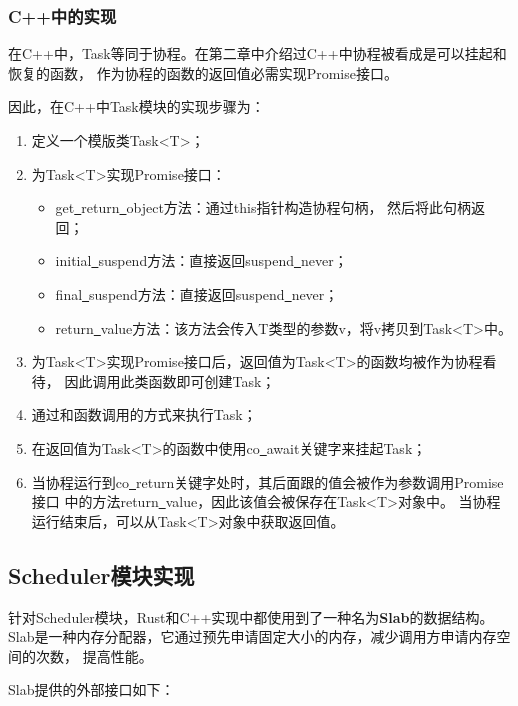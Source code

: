 \documentclass[supercite]{HustGraduPaper}
\theoremstyle{definition}
\begin{document}
\subsubsection{C++中的实现}

在C++中，Task等同于协程。在第二章中介绍过C++中协程被看成是可以挂起和恢复的函数，
作为协程的函数的返回值必需实现Promise接口。\par

因此，在C++中Task模块的实现步骤为：

\begin{enumerate}
  \item 定义一个模版类Task<T>；
  \item 为Task<T>实现Promise接口：
    \begin{itemize}
      \item get\underline{~}return\underline{~}object方法：通过this指针构造协程句柄，
        然后将此句柄返回；
      \item initial\underline{~}suspend方法：直接返回suspend\underline{~}never；
      \item final\underline{~}suspend方法：直接返回suspend\underline{~}never；
      \item return\underline{~}value方法：该方法会传入T类型的参数v，将v拷贝到Task<T>中。
    \end{itemize}
  \item 为Task<T>实现Promise接口后，返回值为Task<T>的函数均被作为协程看待，
    因此调用此类函数即可创建Task；
  \item 通过和函数调用的方式来执行Task；
  \item 在返回值为Task<T>的函数中使用co\underline{~}await关键字来挂起Task；
  \item 当协程运行到co\underline{~}return关键字处时，其后面跟的值会被作为参数调用Promise接口
    中的方法return\underline{~}value，因此该值会被保存在Task<T>对象中。
    当协程运行结束后，可以从Task<T>对象中获取返回值。
\end{enumerate}

\subsection{Scheduler模块实现}

针对Scheduler模块，Rust和C++实现中都使用到了一种名为\textbf{Slab}的数据结构。
Slab是一种内存分配器，它通过预先申请固定大小的内存，减少调用方申请内存空间的次数，
提高性能。\par

Slab提供的外部接口如下：
\end{document}
